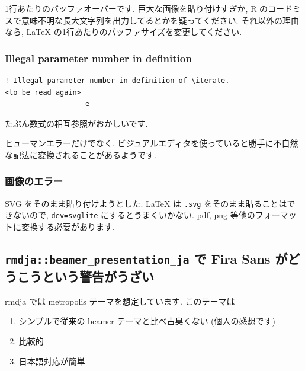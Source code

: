 \documentclass[
]{ltjsarticle}
\providecommand{\tightlist}{%
  \setlength{\itemsep}{0pt}\setlength{\parskip}{0pt}}
\begin{document}
1行あたりのバッファオーバーです. 巨大な画像を貼り付けすぎか, R のコードミスで意味不明な長大文字列を出力してるとかを疑ってください. それ以外の理由なら, LaTeX の1行あたりのバッファサイズを変更してください.

\hypertarget{illegal-parameter-number-in-definition}{%
\subsubsection{Illegal parameter number in definition}\label{illegal-parameter-number-in-definition}}

\begin{verbatim}
! Illegal parameter number in definition of \iterate.
<to be read again> 
                   e
\end{verbatim}

たぶん数式の相互参照がおかしいです.

ヒューマンエラーだけでなく, ビジュアルエディタを使っていると勝手に不自然な記法に変換されることがあるようです.

\hypertarget{ux753bux50cfux306eux30a8ux30e9ux30fc}{%
\subsubsection{画像のエラー}\label{ux753bux50cfux306eux30a8ux30e9ux30fc}}

SVG をそのまま貼り付けようとした. LaTeX は \texttt{.svg} をそのまま貼ることはできないので, \texttt{dev=svglite} にするとうまくいかない. pdf, png 等他のフォーマットに変換する必要があります.

\hypertarget{rmdjabeamer_presentation_ja-ux3067-fira-sans-ux304cux3069ux3046ux3053ux3046ux3068ux3044ux3046ux8b66ux544aux304cux3046ux3056ux3044}{%
\subsection{\texorpdfstring{\texttt{rmdja::beamer\_presentation\_ja} で Fira Sans がどうこうという警告がうざい}{rmdja::beamer\_presentation\_ja で Fira Sans がどうこうという警告がうざい}}\label{rmdjabeamer_presentation_ja-ux3067-fira-sans-ux304cux3069ux3046ux3053ux3046ux3068ux3044ux3046ux8b66ux544aux304cux3046ux3056ux3044}}

rmdja では metropolis テーマを想定しています. このテーマは

\begin{enumerate}
\def\labelenumi{\arabic{enumi}.}
\tightlist
\item
  シンプルで従来の beamer テーマと比べ古臭くない (個人の感想です)
\item
  比較的
\item
  日本語対応が簡単
\end{enumerate}
\end{document}
